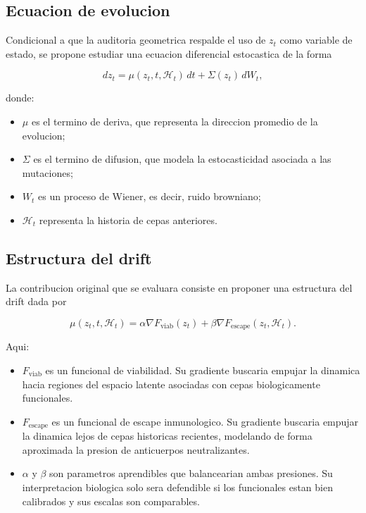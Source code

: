 \documentclass[12pt,letterpaper]{article}
\newcommand{\Hhist}{\mathcal{H}}
\newcommand{\Fviab}{F_{\mathrm{viab}}}
\newcommand{\Fescape}{F_{\mathrm{escape}}}
\begin{document}
\subsection{Ecuacion de evolucion}

Condicional a que la auditoria geometrica respalde el uso de $z_t$ como variable de estado, se propone estudiar una ecuacion diferencial estocastica de la forma

\begin{equation}
    dz_t = \mu(z_t,t,\Hhist_t)\,dt + \Sigma(z_t)\,dW_t,
    \label{eq:sde}
\end{equation}

donde:

\begin{itemize}[leftmargin=2em]
    \item $\mu$ es el termino de deriva, que representa la direccion promedio de la evolucion;
    \item $\Sigma$ es el termino de difusion, que modela la estocasticidad asociada a las mutaciones;
    \item $W_t$ es un proceso de Wiener, es decir, ruido browniano;
    \item $\Hhist_t$ representa la historia de cepas anteriores.
\end{itemize}

\subsection{Estructura del drift}

La contribucion original que se evaluara consiste en proponer una estructura del drift dada por

\begin{equation}
    \mu(z_t,t,\Hhist_t)
    = \alpha \nabla \Fviab(z_t)
    + \beta \nabla \Fescape(z_t,\Hhist_t).
    \label{eq:drift}
\end{equation}

Aqui:

\begin{itemize}[leftmargin=2em]
    \item $\Fviab$ es un funcional de viabilidad. Su gradiente buscaria empujar la dinamica hacia regiones del espacio latente asociadas con cepas biologicamente funcionales.
    \item $\Fescape$ es un funcional de escape inmunologico. Su gradiente buscaria empujar la dinamica lejos de cepas historicas recientes, modelando de forma aproximada la presion de anticuerpos neutralizantes.
    \item $\alpha$ y $\beta$ son parametros aprendibles que balancearian ambas presiones. Su interpretacion biologica solo sera defendible si los funcionales estan bien calibrados y sus escalas son comparables.
\end{itemize}
\end{document}
